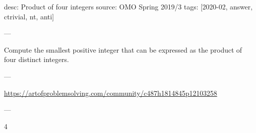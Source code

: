 desc: Product of four integers
source: OMO Spring 2019/3
tags: [2020-02, answer, ctrivial, nt, anti]

---

Compute the smallest positive integer that can be expressed as the product of four distinct integers.

---

\url{https://artofproblemsolving.com/community/c487h1814845p12103258}

---

4
